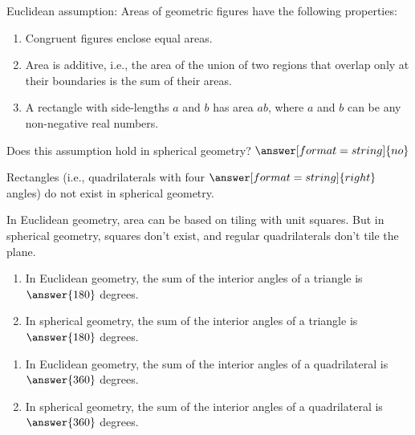 \documentclass{ximera}
\begin{document}
\begin{problem} %
Euclidean assumption:  Areas of geometric figures have the following properties: 
\begin{enumerate}
\item Congruent figures enclose equal areas.
\item Area is additive, i.e., the area of the union of two regions that overlap only at their boundaries is the sum of their areas. 
\item A rectangle with side-lengths $a$ and $b$ has area $ab$, where $a$ and $b$ can be any non-negative real numbers.
\end{enumerate}

Does this assumption hold in spherical geometry? 
$\answer[format=string]{no}$
\begin{problem}
Rectangles (i.e., quadrilaterals with four $\answer[format=string]{right}$ angles) do not exist in spherical geometry.  %

In Euclidean geometry, area can be based on tiling with unit squares.  But in spherical geometry, squares don't exist, and regular quadrilaterals don't tile the plane.
\end{problem}
\end{problem}


\begin{problem}
\begin{enumerate}
\item In Euclidean geometry, the sum of the interior angles of a triangle is 
$\answer{180}$ degrees.
\item In spherical geometry, the sum of the interior angles of a triangle is 
$\answer{180}$ degrees.
\end{enumerate}
\end{problem}

\begin{problem}
\begin{enumerate}
\item In Euclidean geometry, the sum of the interior angles of a quadrilateral is 
$\answer{360}$ degrees.
\item In spherical geometry, the sum of the interior angles of a quadrilateral is 
$\answer{360}$ degrees.
\end{enumerate}
\end{problem}
\end{document}
